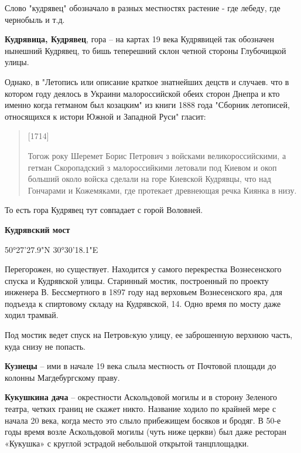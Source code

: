 Слово "кудрявец" обозначало в разных местностях растение - где лебеду, где чернобыль и т.д.\\

\medskip

\textbf{Кудрявица, Кудрявец}, гора – на картах 19 века Кудрявицей так обозначен нынешний Кудрявец, то бишь теперешний склон четной стороны Глубочицкой улицы.

Однако, в "Летопись или описание краткое знатнейших децств и случаев. что в котором году деялось в Украини малороссийской обеих сторон Днепра и кто именно когда гетманом был козацким" из книги 1888 года "Сборник летописей, относящихся к истори Южной и Западной Руси" гласит:

\begin{quotation}
[1714]

Тогож року Шеремет Борис Петрович з войсками великороссийскими, а гетман Скоропадский з малороссийкими летовали под Киевом и окоп больший около войска сделали на горе Киевской Кудрявцы, что над Гончарами и Кожемяками, где протекает древнеющая речка Киянка в низу.
\end{quotation}

То есть гора Кудрявец тут совпадает с горой Воловней.\\


\medskip

\textbf{Кудрявский мост}

50°27'27.9"N 30°30'18.1"E

Перегорожен, но существует. Находится у самого перекрестка Вознесенского спуска и Кудрявской улицы. Старинный мостик, построенный по проекту инженера В. Бессмертного в 1897 году над верховьем Вознесенского яра, для подъезда к спиртовому складу на Кудрявской, 14. Одно время по мосту даже ходил трамвай.

Под мостик ведет спуск на Петровcкую улицу, ее заброшенную верхнюю часть, куда снизу не попасть.\\

\medskip


\textbf{Кузнецы} – ими в начале 19 века слыла местность от Почтовой площади до колонны Магдебургскому праву.\\

\medskip

\textbf{Кукушкина дача} – окрестности Аскольдовой могилы и в сторону Зеленого театра, четких границ не скажет никто. Название ходило по крайней мере с начала 20 века, когда место это слыло прибежищем босяков и бродяг. В 50-е годы время возле Аскольдовой могилы (чуть ниже церкви) был даже ресторан «Кукушка» с круглой эстрадой небольшой открытой танцплощадки. \\


